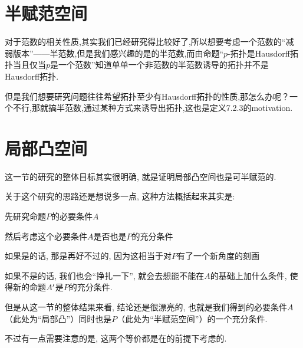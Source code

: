     \section{半赋范空间}
    对于范数的相关性质,其实我们已经研究得比较好了,所以想要考虑一个范数的“减弱版本”——半范数,但是我们感兴趣的是的半范数,而由命题“$p$-拓扑是Hausdorff拓扑当且仅当$p$是一个范数”知道单单一个非范数的半范数诱导的拓扑并不是Hausdorff拓扑.

    但是我们想要研究问题往往希望拓扑至少有Hausdorff拓扑的性质,那怎么办呢？一个不行,那就搞半范数,通过某种方式来诱导出拓扑,这也是定义7.2.3的motivation.
    \section{局部凸空间}
    这一节的研究的整体目标其实很明确, 就是证明局部凸空间也是可半赋范的.

    关于这个研究的思路还是想说多一点, 这种方法概括起来其实是:
    \begin{step}
        \item 先研究命题$P$的必要条件$A$
        \item 然后考虑这个必要条件$A$是否也是$P$的充分条件
        \item 如果是的话, 那是再好不过的, 因为这相当于对$P$有了一个新角度的刻画
        \item 如果不是的话, 我们也会“挣扎一下”, 就会去想能不能在$A$的基础上加什么条件, 使得新的命题$A^{\prime}$是$P$的充分条件.
    \end{step}

    但是从这一节的整体结果来看, 结论还是很漂亮的, 也就是我们得到的必要条件$A$（此处为“局部凸”）同时也是$P$（此处为“半赋范空间”）的一个充分条件.
    \begin{remark}
        不过有一点需要注意的是, 这两个等价都是在的前提下考虑的.
    \end{remark}

